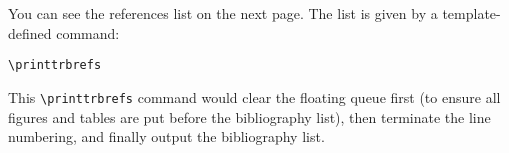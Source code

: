 \documentclass[12pt]{trbart}
\begin{document}
You can see the references list on the next page. The list is given by a template-defined command:
\begin{verbatim}
\printtrbrefs
\end{verbatim}

This \verb+\printtrbrefs+ command would clear the floating queue first (to ensure all figures and tables are put before the bibliography list), then terminate the line numbering, and finally output the bibliography list.

\printtrbrefs%
\end{document}
